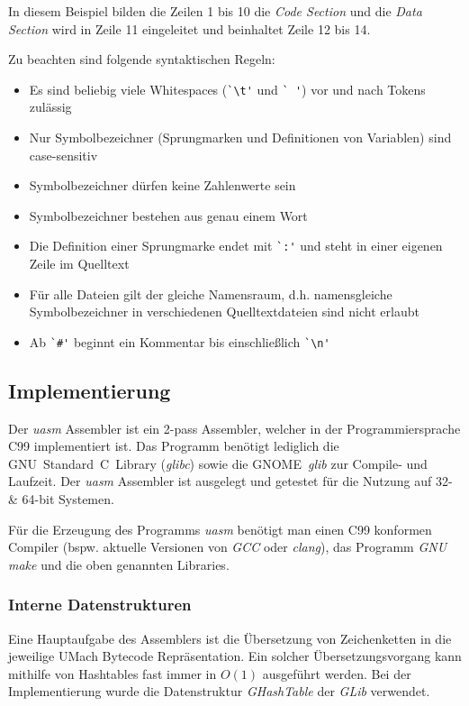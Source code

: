 In diesem Beispiel bilden die Zeilen 1 bis 10 die \emph{Code Section} und die
\emph{Data Section} wird in Zeile 11 eingeleitet und beinhaltet Zeile 12 bis 14.

Zu beachten sind folgende syntaktischen Regeln:
\begin{itemize}
    \item Es sind beliebig viele Whitespaces (\verb#`\t'# und \verb*#` '#) vor
          und nach Tokens zulässig
    \item Nur Symbolbezeichner (Sprungmarken und Definitionen von Variablen)
          sind case-sensitiv
    \item Symbolbezeichner dürfen keine Zahlenwerte sein
    \item Symbolbezeichner bestehen aus genau einem Wort
    \item Die Definition einer Sprungmarke endet mit \verb#`:'# und steht in
          einer eigenen Zeile im Quelltext
    \item Für alle Dateien gilt der gleiche Namensraum, d.h. namensgleiche
          Symbolbezeichner in verschiedenen Quelltextdateien sind nicht erlaubt
    \item Ab \verb|`#'| beginnt ein Kommentar bis einschließlich \verb#`\n'#
\end{itemize}

\subsection{Implementierung}

Der \emph{uasm} Assembler ist ein 2-pass Assembler, welcher in der
Programmiersprache C99 implementiert ist. Das Programm benötigt lediglich
die GNU~Standard~C~Library (\emph{glibc}) sowie die GNOME~\emph{glib} zur
Compile- und Laufzeit. Der \emph{uasm} Assembler ist ausgelegt und getestet für
die Nutzung auf 32- \& 64-bit Systemen.

Für die Erzeugung des Programms \emph{uasm} benötigt man einen C99 konformen
Compiler (bspw. aktuelle Versionen von \emph{GCC} oder \emph{clang}), das
Programm \emph{GNU make} und die oben genannten Libraries.

\subsubsection{Interne Datenstrukturen}

Eine Hauptaufgabe des Assemblers ist die Übersetzung von Zeichenketten in die
jeweilige UMach Bytecode Repräsentation. Ein solcher Übersetzungsvorgang kann
mithilfe von Hashtables fast immer in $O(1)$ ausgeführt werden. Bei der
Implementierung wurde die Datenstruktur \emph{GHashTable} der \emph{GLib}
verwendet.

